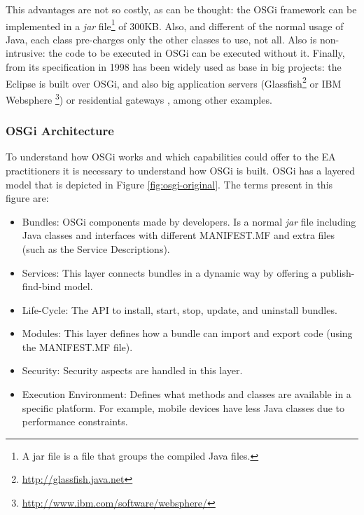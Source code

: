 This advantages are not so
                               costly, as can be thought: the OSGi
                                framework can be implemented in a
                                {\em jar} file\footnote{A jar file is
                                a file that groups the compiled Java
                                files.} of 300KB. Also, and different
                                of the normal usage of Java, each
                                class pre-charges only the other
                                classes to use, not all. Also is
                                non-intrusive: the code to be
                                executed in OSGi can be executed
                                without it. Finally, from its
                                specification in 1998 has been widely
                                used as base in big projects: the
                                Eclipse  is built over OSGi, and
                                also big application servers
                               (Glassfish\footnote{\url{http://glassfish.java.net}} 
                               or IBM Websphere \footnote{\url{http://www.ibm.com/software/websphere/}}) or
                               residential gateways
                               \cite{GarciaSanchez2013Gateway}, among other
                               examples. 

\subsubsection{OSGi Architecture}
To understand how OSGi \cite{Moussa2010Composition} works and which capabilities could offer to the EA practitioners it is necessary to understand how OSGi is built. OSGi has a layered model that is depicted in Figure \ref{fig:osgi-original}. The terms present in this figure are:

\begin{itemize}
\item Bundles: OSGi components made by developers. Is a normal {\em jar} file including Java classes and interfaces with different MANIFEST.MF and extra files (such as the Service Descriptions).
\item Services: This layer connects bundles in a dynamic way by offering a publish-find-bind model.
\item Life-Cycle: The API to install, start, stop, update, and uninstall bundles.
\item Modules: This layer defines how a bundle can import and export code (using the MANIFEST.MF file).
\item Security: Security aspects are handled in this layer.
\item Execution Environment: Defines what methods and classes are available in a specific platform. For example, mobile devices have less Java classes due to performance constraints.
\end{itemize}

